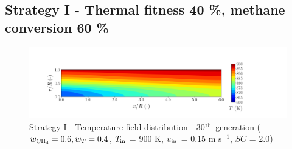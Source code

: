 \documentclass[preprint,12pt]{elsarticle}
\begin{document}


\clearpage



\subsection{Strategy I - Thermal fitness 40 \%, methane conversion 60 \%} 
\label{subsec:S16040}

%

\begin{figure}[h!]
\centering
\includegraphics[width=150mm]{results/5/60C_40T/GEN30-TFIELD.png}
\caption{\label{fig:5R6040G30-TField} Strategy I - Temperature field distribution - 30$^{\rm{th}}$ generation ($w_{\rm{CH_4}} = 0.6, w_T = 0.4$, $T_{\rm{in}}$ = 900 K, $u_{\rm{in}}$ = 0.15 m s$^{-1}$, $SC$ = 2.0)}
\end{figure}

%
\end{document}
